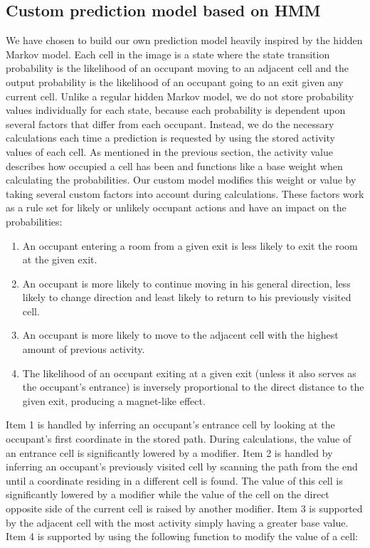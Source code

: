 \subsection{Custom prediction model based on HMM}
\label{ssub:designcustomprediction}
We have chosen to build our own prediction model heavily inspired by the hidden Markov model. Each cell in the image is a state where the state transition probability is the likelihood of an occupant moving to an adjacent cell and the output probability is the likelihood of an occupant going to an exit given any current cell. Unlike a regular hidden Markov model, we do not store probability values individually for each state, because each probability is dependent upon several factors that differ from each occupant. Instead, we do the necessary calculations each time a prediction is requested by using the stored activity values of each cell. As mentioned in the previous section, the activity value describes how occupied a cell has been and functions like a base weight when calculating the probabilities. Our custom model modifies this weight or value by taking several custom factors into account during calculations. These factors work as a rule set for likely or unlikely occupant actions and have an impact on the probabilities:
\begin{enumerate}
\item An occupant entering a room from a given exit is less likely to exit the room at the given exit.
\item An occupant is more likely to continue moving in his general direction, less likely to change direction and least likely to return to his previously visited cell.
\item An occupant is more likely to move to the adjacent cell with the highest amount of previous activity.
\item The likelihood of an occupant exiting at a given exit (unless it also serves as the occupant's entrance) is inversely proportional to the direct distance to the given exit, producing a magnet-like effect.
\end{enumerate}
Item 1 is handled by inferring an occupant's entrance cell by looking at the occupant's first coordinate in the stored path. During calculations, the value of an entrance cell is significantly lowered by a modifier. Item 2 is handled by inferring an occupant's previously visited cell by scanning the path from the end until a coordinate residing in a different cell is found. The value of this cell is significantly lowered by a modifier while the value of the cell on the direct opposite side of the current cell is raised by another modifier. Item 3 is supported by the adjacent cell with the most activity simply having a greater base value. Item 4 is supported by using the following function to modify the value of a cell:
 
